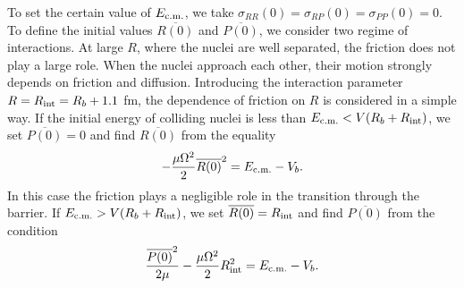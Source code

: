 \documentclass[preprint,review,12pt]{elsarticle}
\begin{document}
  To set the certain value of $E_{\rm c.m.}$, we take $\sigma_{RR}(0)=\sigma_{RP}(0)=\sigma_{PP}(0)=0$.
  To define the initial values $\overline{R(0)}$ and $\overline{P(0)}$, we consider two regime of interactions.
  At large $R$, where the nuclei are well separated,
  the friction does not play a large role. When the nuclei approach each other,
  their motion strongly depends on friction and diffusion.
  Introducing the interaction parameter $R=R_{\rm int}=R_b+1.1$ fm, the dependence of friction on $R$ is
  considered in a simple way.
  If the initial energy of colliding nuclei is less than
  $E_{\rm c.m.}<V(R_b+R_{\rm int})$, we set $\overline{P(0)}=0$ and find $\overline{R(0)}$ from the equality
  $$-\dfrac{\mu \Omega^2}{2}\overline{R(0)}^2=E_{\rm c.m.}-V_b.$$
  In this case the friction plays a negligible role in the transition through the
  barrier.
  If $E_{\rm c.m.}>V(R_b+R_{\rm int})$, we set $\overline{R(0)}=R_{\rm int}$ and find $\overline{P(0)}$
  from the condition
  $$\dfrac{\overline{P(0)}^2}{2 \mu}-\dfrac{\mu \Omega^2}{2}R_{\rm int}^2=E_{\rm c.m.}-V_b.$$
\end{document}
